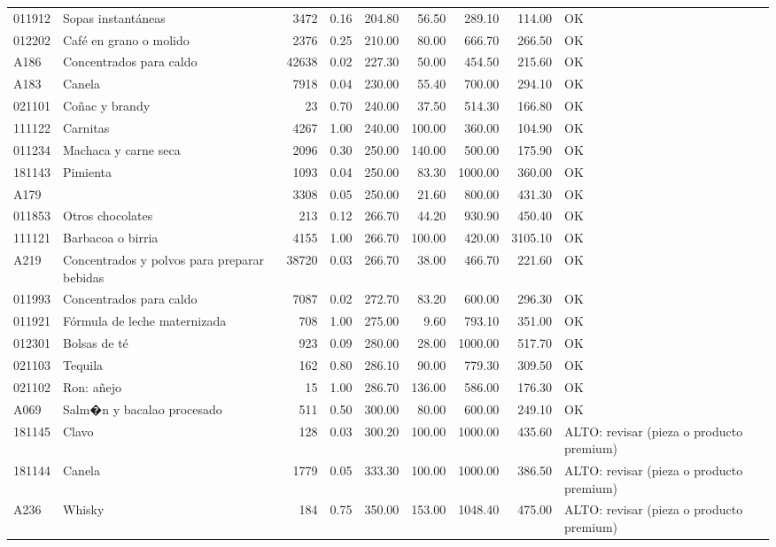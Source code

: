 \begin{table}[ht]
\begin{tabular}{llrrrrrrl}
  011912 & Sopas instantáneas & 3472 & 0.16 & 204.80 & 56.50 & 289.10 & 114.00 & OK \\ 
  012202 & Café en grano o molido & 2376 & 0.25 & 210.00 & 80.00 & 666.70 & 266.50 & OK \\ 
  A186 & Concentrados para caldo & 42638 & 0.02 & 227.30 & 50.00 & 454.50 & 215.60 & OK \\ 
  A183 & Canela & 7918 & 0.04 & 230.00 & 55.40 & 700.00 & 294.10 & OK \\ 
  021101 & Coñac y brandy &  23 & 0.70 & 240.00 & 37.50 & 514.30 & 166.80 & OK \\ 
  111122 & Carnitas & 4267 & 1.00 & 240.00 & 100.00 & 360.00 & 104.90 & OK \\ 
  011234 & Machaca y carne seca & 2096 & 0.30 & 250.00 & 140.00 & 500.00 & 175.90 & OK \\ 
  181143 & Pimienta & 1093 & 0.04 & 250.00 & 83.30 & 1000.00 & 360.00 & OK \\ 
  A179 &  & 3308 & 0.05 & 250.00 & 21.60 & 800.00 & 431.30 & OK \\ 
  011853 & Otros chocolates & 213 & 0.12 & 266.70 & 44.20 & 930.90 & 450.40 & OK \\ 
  111121 & Barbacoa o birria & 4155 & 1.00 & 266.70 & 100.00 & 420.00 & 3105.10 & OK \\ 
  A219 & Concentrados y polvos para preparar bebidas & 38720 & 0.03 & 266.70 & 38.00 & 466.70 & 221.60 & OK \\ 
  011993 & Concentrados para caldo & 7087 & 0.02 & 272.70 & 83.20 & 600.00 & 296.30 & OK \\ 
  011921 & Fórmula de leche maternizada & 708 & 1.00 & 275.00 & 9.60 & 793.10 & 351.00 & OK \\ 
  012301 & Bolsas de té & 923 & 0.09 & 280.00 & 28.00 & 1000.00 & 517.70 & OK \\ 
  021103 & Tequila & 162 & 0.80 & 286.10 & 90.00 & 779.30 & 309.50 & OK \\ 
  021102 & Ron: añejo &  15 & 1.00 & 286.70 & 136.00 & 586.00 & 176.30 & OK \\ 
  A069 & Salm�n y bacalao procesado & 511 & 0.50 & 300.00 & 80.00 & 600.00 & 249.10 & OK \\ 
  181145 & Clavo & 128 & 0.03 & 300.20 & 100.00 & 1000.00 & 435.60 & ALTO: revisar (pieza o producto premium) \\ 
  181144 & Canela & 1779 & 0.05 & 333.30 & 100.00 & 1000.00 & 386.50 & ALTO: revisar (pieza o producto premium) \\ 
  A236 & Whisky & 184 & 0.75 & 350.00 & 153.00 & 1048.40 & 475.00 & ALTO: revisar (pieza o producto premium) \\ 

\end{tabular}
\end{table}
